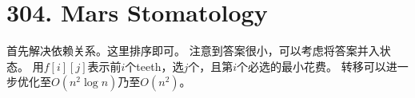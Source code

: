 \section{304. Mars Stomatology}
首先解决依赖关系。这里排序即可。
注意到答案很小，可以考虑将答案并入状态。
用$f[i][j]$表示前$i$个teeth，选$j$个，且第$i$个必选的最小花费。
转移可以进一步优化至$O(n^2\log n)$乃至$O(n^2)$。
